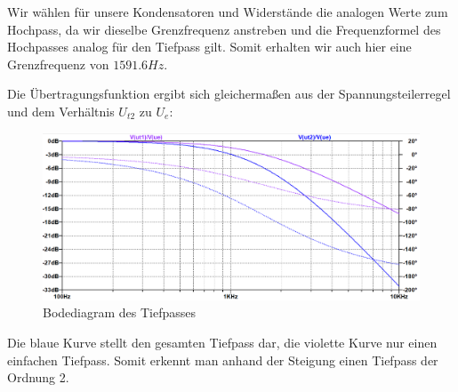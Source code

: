 Wir wählen für unsere Kondensatoren und Widerstände die analogen Werte zum Hochpass, da wir dieselbe Grenzfrequenz anstreben und die Frequenzformel des Hochpasses analog für den Tiefpass gilt. Somit erhalten wir auch hier eine Grenzfrequenz von $1591.6Hz$.

\newpage
Die Übertragungsfunktion ergibt sich gleichermaßen aus der Spannungsteilerregel und dem Verhältnis $U_{t2}$ zu $U_{e}$:

\newpage
\begin{figure}[htb]
    \includegraphics[width=16cm]{./pictures/Tiefpass_Bode}
    \caption{Bodediagram des Tiefpasses}
    \label{fig:TiefpassBode}
\end{figure}

Die blaue Kurve stellt den gesamten Tiefpass dar, die violette Kurve nur einen einfachen Tiefpass. Somit erkennt man anhand der Steigung einen Tiefpass der Ordnung 2.

